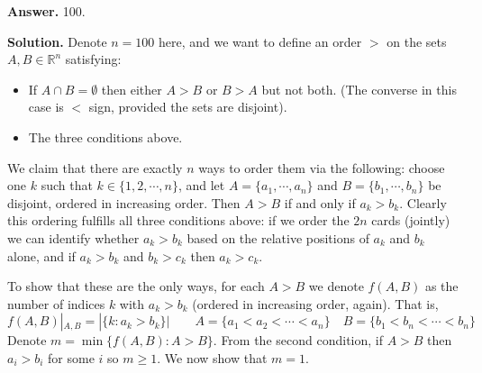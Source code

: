 \documentclass[11pt,a4paper]{article}
\begin{document}
\begin{enumerate}
	\textbf{Answer.} 100. 
	
	\textbf{Solution.} Denote $n=100$ here, and we want to define an order $>$ on the sets $A, B\in \mathbb{R}^{n}$ satisfying: 
	\begin{itemize}
		\item If $A\cap B=\emptyset$ then either $A>B$ or $B>A$ but not both. (The converse in this case is $<$ sign, provided the sets are disjoint). 
		
		\item The three conditions above. 
	\end{itemize}
	We claim that there are exactly $n$ ways to order them via the following: choose one $k$ such that $k\in \{1, 2, \cdots , n\}$, and let $A=\{a_1, \cdots , a_n\}$ and $B=\{b_1, \cdots, b_n\}$ be disjoint, ordered in increasing order. Then $A>B$ if and only if $a_k>b_k$. Clearly this ordering fulfills all three conditions above: if we order the $2n$ cards (jointly) we can identify whether $a_k>b_k$ based on the relative positions of $a_k$ and $b_k$ alone, and if $a_k>b_k$ and $b_k>c_k$ then $a_k>c_k$. 
	
	To show that these are the only ways, for each $A>B$ we denote $f(A, B)$ as the number of indices $k$ with $a_k>b_k$ (ordered in increasing order, again). That is, 
	\[
	f(A, B)|_{A, B} = |\{k: a_k>b_k\}|\qquad A=\{a_1<a_2<\cdots <a_n\}\quad B=\{b_1<b_n<\cdots < b_n\}
	\]
	Denote $m=\min\{f(A, B): A>B\}$. From the second condition, if $A>B$ then $a_i>b_i$ for some $i$ so $m\ge 1$. We now show that $m=1$. 
	

\end{enumerate}
\end{document}
